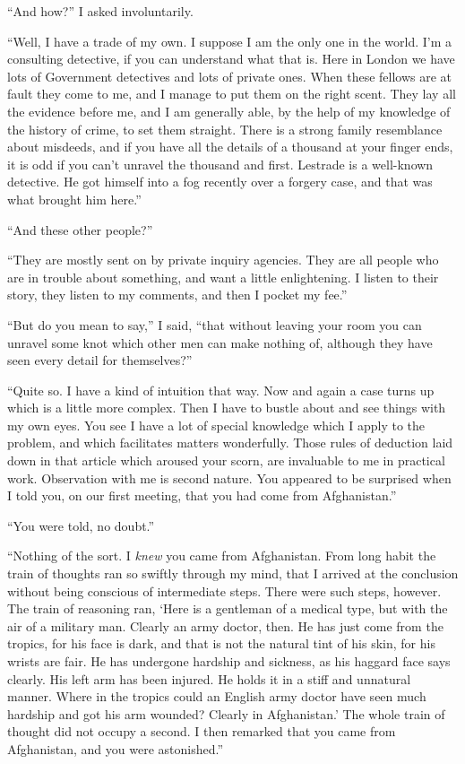 \documentclass[12pt,english]{book}
\begin{document}
{}``And how?'' I asked involuntarily.

{}``Well, I have a trade of my own. I suppose I am the only one in
the world. I'm a consulting detective, if you can understand what
that is. Here in London we have lots of Government detectives and
lots of private ones. When these fellows are at fault they come to
me, and I manage to put them on the right scent. They lay all the
evidence before me, and I am generally able, by the help of my knowledge
of the history of crime, to set them straight. There is a strong family
resemblance about misdeeds, and if you have all the details of a thousand
at your finger ends, it is odd if you can't unravel the thousand and
first. Lestrade is a well-known detective. He got himself into a fog
recently over a forgery case, and that was what brought him here.''

{}``And these other people?''

{}``They are mostly sent on by private inquiry agencies. They are
all people who are in trouble about something, and want a little enlightening.
I listen to their story, they listen to my comments, and then I pocket
my fee.''

{}``But do you mean to say,'' I said, {}``that without leaving
your room you can unravel some knot which other men can make nothing
of, although they have seen every detail for themselves?''

{}``Quite so. I have a kind of intuition that way. Now and again
a case turns up which is a little more complex. Then I have to bustle
about and see things with my own eyes. You see I have a lot of special
knowledge which I apply to the problem, and which facilitates matters
wonderfully. Those rules of deduction laid down in that article which
aroused your scorn, are invaluable to me in practical work. Observation
with me is second nature. You appeared to be surprised when I told
you, on our first meeting, that you had come from Afghanistan.''

{}``You were told, no doubt.''

{}``Nothing of the sort. I \textit{knew} you came from Afghanistan.
From long habit the train of thoughts ran so swiftly through my mind,
that I arrived at the conclusion without being conscious of intermediate
steps. There were such steps, however. The train of reasoning ran,
`Here is a gentleman of a medical type, but with the air of a military
man. Clearly an army doctor, then. He has just come from the tropics,
for his face is dark, and that is not the natural tint of his skin,
for his wrists are fair. He has undergone hardship and sickness, as
his haggard face says clearly. His left arm has been injured. He holds
it in a stiff and unnatural manner. Where in the tropics could an
English army doctor have seen much hardship and got his arm wounded?
Clearly in Afghanistan.' The whole train of thought did not occupy
a second. I then remarked that you came from Afghanistan, and you
were astonished.''
\end{document}

